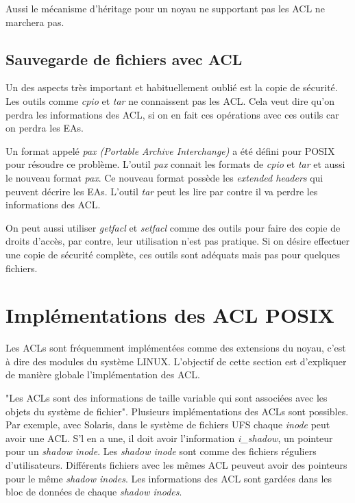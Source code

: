 \documentclass{article}
\begin{document}
Aussi le mécanisme d'héritage pour un noyau ne supportant pas les ACL ne marchera pas. 

\subsection{Sauvegarde de fichiers avec ACL}

Un des aspects très important et habituellement oublié est la copie de sécurité. Les outils comme \emph{cpio} et \emph{tar} ne connaissent pas les ACL. Cela veut dire qu'on perdra les informations des ACL, si on en fait ces opérations avec ces outils car on perdra les EAs.

Un format appelé \emph{pax (Portable Archive Interchange)} a été défini pour POSIX pour résoudre ce problème. L'outil \emph{pax} connait les formats de \emph{cpio} et \emph{tar} et aussi le nouveau format \emph{pax}. Ce nouveau format possède les \emph{extended headers} qui peuvent décrire les EAs. L'outil \emph{tar} peut les lire par contre il va perdre les informations des ACL. 

On peut aussi utiliser \emph{getfacl} et \emph{setfacl} comme des outils pour faire des copie de droits d'accès, par contre, leur utilisation n'est pas pratique. Si on désire effectuer une copie de sécurité complète, ces outils sont adéquats mais pas pour quelques fichiers. 

\section{Implémentations des ACL POSIX}

Les ACLs sont fréquemment implémentées comme des extensions du noyau, c'est à dire des modules du système LINUX. L'objectif de cette section est d'expliquer de manière globale l'implémentation des ACL. 
 
"Les ACLs sont des informations de taille variable qui sont associées avec les objets du système de fichier"\cite{aclsuse}. Plusieurs implémentations des ACLs sont possibles. Par exemple, avec Solaris, dans le système de fichiers UFS\cite{acl_permission} chaque \emph{inode} peut avoir une ACL. S'l en a une, il doit avoir l'information \emph{i\_shadow}, un pointeur pour un \emph{shadow inode}. Les \emph{shadow inode} sont comme des fichiers réguliers d'utilisateurs. Différents fichiers avec les mêmes ACL peuveut avoir des pointeurs pour le même \emph{shadow inodes}. Les informations des ACL sont gardées dans les bloc de données de chaque \emph{shadow inodes}.
 
\end{document}
